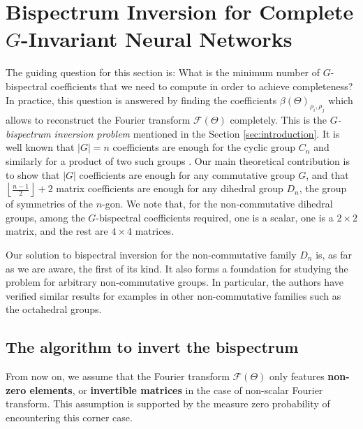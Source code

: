 \documentclass{article}
\theoremstyle{plain}
\theoremstyle{definition}
\theoremstyle{remark}
\begin{document}
\section{Bispectrum Inversion for Complete $G$-Invariant Neural Networks}\label{sec:bspinversion}
The guiding question for this section is: What is the minimum number of $G$-bispectral coefficients that we need to compute in order to achieve completeness? In practice, this question is answered by finding the coefficients $\beta(\Theta)_{\rho_i,\rho_j}$ which allows to reconstruct the Fourier transform $\mathcal{F}(\Theta)$ completely. This is the \emph{$G$-bispectrum inversion problem} mentioned in the Section \ref{sec:introduction}. It is well known that $|G|=n$ coefficients are enough for the cyclic group $C_n$ \cite{kakarala_thesis, sadler1992shift} and similarly for a product of two such groups \cite{giannakis1989signal}. Our main theoretical contribution is to show that $|G|$ coefficients are enough for any commutative group $G$, and that $\left \lfloor{ \frac{n-1}{2}}\right \rfloor + 2$
matrix coefficients are enough for any dihedral group $D_n$, the group of symmetries of the $n$-gon. We note that, for the non-commutative dihedral groups, among the $G$-bispectral coefficients required, one is a scalar, one is a $2\times2$ matrix, and the rest are $4\times 4$ matrices.

Our solution to bispectral inversion for the non-commutative family $D_n$ is, as far as we are aware, the first of its kind.  It also forms a foundation for studying the problem for arbitrary non-commutative groups.  In particular, the authors have verified similar results for examples in other non-commutative families such as the octahedral groups.

\subsection{The algorithm to invert the bispectrum}\label{sec:commutative_alg}
From now on, we assume that the Fourier transform $\mathcal{F}(\Theta)$ only features \textbf{non-zero elements}, or \textbf{invertible matrices} in the case of non-scalar Fourier transform. This assumption is supported by the measure zero probability of encountering this corner case.
\end{document}
